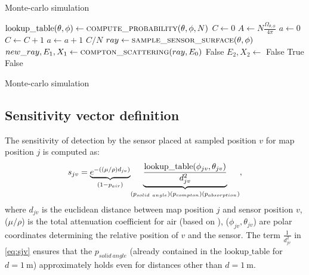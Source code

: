 \begin{algorithm}[h!]
\caption{Monte-carlo simulation}\label{alg:cap}
\begin{algorithmic}
      \State $\mathrm{lookup\_table}(\theta, \phi) \gets \Call{compute\_probability}{\theta, \phi, N}$
    \EndFor
  \EndFor
\EndFunction
\Statex
{}
\State $C \gets 0$
\State $A \gets N\frac{\Omega_{\theta, \phi}}{4 \pi}$ 
\State $a \gets 0$
   
  \State $C \gets C + 1 $ 
  \EndIf
  \State $a \gets a + 1$
\EndWhile
  \State \Return $C/N$ 
  \EndFunction
\Statex
  \State $ray \gets \Call{sample\_sensor\_surface}{\theta,\phi}$ 
   
  \State $new\_ray, E_{1}, X_{1} \gets \Call{compton\_scattering}{ray, E_{0}}$ %
  \Else{}
    \State \Return False 
  \EndIf
    
    \State $E_{2}, X_{2} \gets $
  \Else{}
    \State \Return False
  \EndIf
    
    \State \Return True   
    \Else{}
    \State \Return False
  \EndIf
\EndFunction
\end{algorithmic}
  \label{alg:monte}
  \caption{Monte-carlo simulation}
\end{algorithm}

\subsection{Sensitivity vector definition}%
The sensitivity of detection by the sensor placed at sampled position $v$ for map position $j$ is computed as:
\begin{equation}
  s_{jv} = \underset{(1-p_{air})}{\underbrace{e^{-((\mu/\rho) d_{jv})} }} \underset{(p_{solid\ angle})\\(p_{compton})\\(p_{absorption})} {\underbrace{\frac{\mathrm{lookup\_table}(\phi_{jv}, \theta_{jv})}{d^{2}_{jv}}}},  
  \label{eq:sjv}
\end{equation}
where $d_{jv}$ is the euclidean distance between map position $j$ and sensor position $v$, ($\mu/\rho$) is the total attenuation coefficient for air (based on \cite{nist}), ($\phi_{jv}, \theta_{jv}$) are polar coordinates determining the relative position of $v$ and the sensor. 
The term $\frac{1}{d^{2}_{jv}}$ in \ref{eq:sjv} ensures that the $p_{solid\ angle}$ (already contained in the $\mathrm{lookup\_table}$ for $d = \SI{1}\meter$) approximately holds even for distances other than $d = \SI{1}\meter$.

